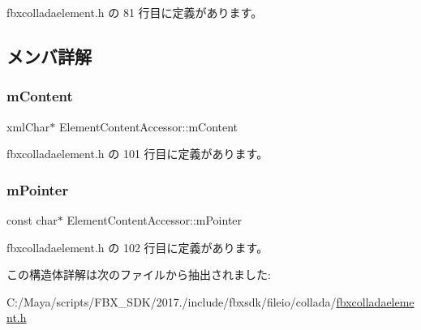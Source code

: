  fbxcolladaelement.\+h の 81 行目に定義があります。



\subsection{メンバ詳解}
\mbox{\label{struct_element_content_accessor_a3b06ccf10e2deb2e1308bb5bc4bf9532}} 
\subsubsection{\texorpdfstring{m\+Content}{mContent}}
{\footnotesize\ttfamily xml\+Char$\ast$ Element\+Content\+Accessor\+::m\+Content}



 fbxcolladaelement.\+h の 101 行目に定義があります。

\mbox{\label{struct_element_content_accessor_a086d33aecd0a61b63fb21ff4d744e463}} 
\subsubsection{\texorpdfstring{m\+Pointer}{mPointer}}
{\footnotesize\ttfamily const char$\ast$ Element\+Content\+Accessor\+::m\+Pointer}



 fbxcolladaelement.\+h の 102 行目に定義があります。



この構造体詳解は次のファイルから抽出されました\+:\begin{DoxyCompactItemize}
\item 
C\+:/\+Maya/scripts/\+F\+B\+X\+\_\+\+S\+D\+K/2017./include/fbxsdk/fileio/collada/\hyperlink{fbxcolladaelement_8h}{fbxcolladaelement.\+h}\end{DoxyCompactItemize}
